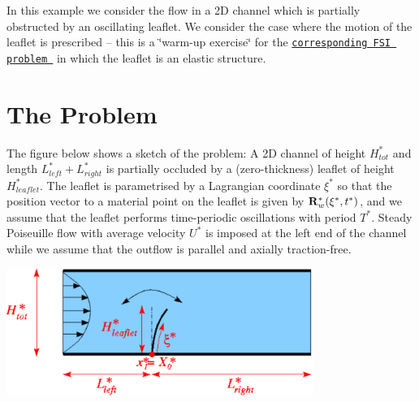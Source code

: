 In this example we consider the flow in a 2D channel which is partially obstructed by an oscillating leaflet. We consider the case where the motion of the leaflet is prescribed -- this is a \char`\"{}warm-\/up exercise\char`\"{} for the \href{../../../interaction/fsi_channel_with_leaflet/html/index.html}{\tt corresponding F\+SI problem } in which the leaflet is an elastic structure.



 

\hypertarget{index_the_problem}{}\section{The Problem}\label{index_the_problem}
The figure below shows a sketch of the problem\+: A 2D channel of height $ H^*_{tot}$ and length $ L^*_{left} + L^*_{right} $ is partially occluded by a (zero-\/thickness) leaflet of height $ H^*_{leaflet} $. The leaflet is parametrised by a Lagrangian coordinate $ \xi^* $ so that the position vector to a material point on the leaflet is given by $ {\bf R}^*_w(\xi^*,t^*) $, and we assume that the leaflet performs time-\/periodic oscillations with period $ T^*. $ Steady Poiseuille flow with average velocity $ U^* $ is imposed at the left end of the channel while we assume that the outflow is parallel and axially traction-\/free.

 
\begin{DoxyImage}
\includegraphics[width=0.75\textwidth]{channel_with_leaflet_dim}
\end{DoxyImage}


